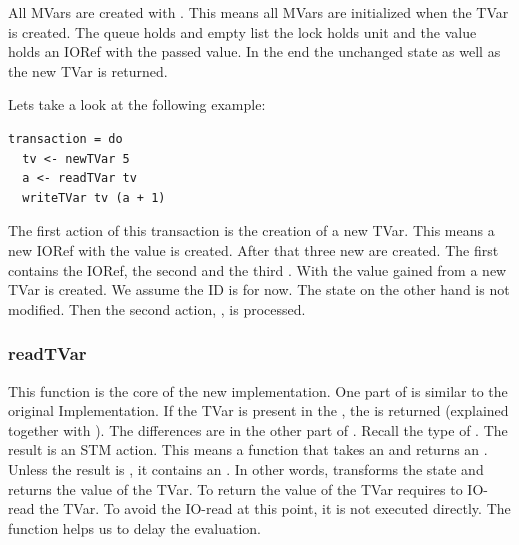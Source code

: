 All MVars are created with . This means all MVars are initialized when the TVar is created.
The queue holds and empty list the lock holds unit and the value holds an IORef with the passed value.
In the end the unchanged state as well as the new TVar is returned.

Lets take a look at the following example:
\begin{lstlisting}
transaction = do 
  tv <- newTVar 5
  a <- readTVar tv
  writeTVar tv (a + 1)
\end{lstlisting}
The first action of this transaction is the creation of a new TVar. This means a new IORef with 
the value  is created. After that three new  are created. The first contains the 
IORef, the second \code{[]} and the third \code{()}. With the value gained from 
 a new TVar is created. We assume the ID is  for now. 
The state on the other hand is not modified. Then the 
second action, , is processed.


\subsubsection{readTVar}
This function is the core of the new implementation. One part of  is similar to the original 
Implementation. If the TVar is present in the , the  is returned (explained together with ).
The differences are in the other part of . Recall the type of .
The result is an STM action. This means a function that takes an  and returns an . 
Unless the result is , it contains an . In other words,  transforms
the state and returns the value of the TVar. To return the value of the TVar requires to IO-read the
TVar. To avoid the IO-read at this point, it is not executed directly. The function  helps us 
to delay the evaluation.

